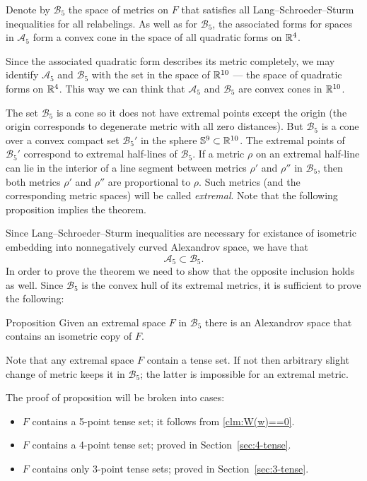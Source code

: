 \documentclass{article}
\begin{document}
Denote by $\mathcal{B}_5$ the space of metrics on $F$ that satisfies all Lang--Schroeder--Sturm inequalities for all relabelings.
As well as for $\mathcal{B}_5$, the associated forms for spaces in $\mathcal{A}_5$ form a convex cone in the space of all quadratic forms on $\mathbb{R}^4$.

Since the associated quadratic form describes its metric completely, we may identify $\mathcal{A}_5$ and $\mathcal{B}_5$ with the set in the space of $\mathbb{R}^{10}$ --- the space of quadratic forms on $\mathbb{R}^4$.
This way we can think that $\mathcal{A}_5$ and $\mathcal{B}_5$ are convex cones in $\mathbb{R}^{10}$.

The set $\mathcal{B}_5$ is a cone so it does not have extremal points except the origin (the origin corresponds to degenerate metric with all zero distances).
But $\mathcal{B}_5$ is a cone over a convex compact set $\mathcal{B}_5'$ in the sphere $\mathbb{S}^9\subset \mathbb{R}^{10}$.
The extremal points of $\mathcal{B}_5'$ correspond to extremal half-lines of $\mathcal{B}_5$.
If a metric $\rho$ on an extremal half-line can lie in the interior of a line segment between metrics $\rho'$ and $\rho''$ in $\mathcal{B}_5$, then both metrics $\rho'$ and $\rho''$ are proportional to $\rho$.
Such metrics (and the corresponding metric spaces) will be called \emph{extremal}.
Note that the following proposition implies the theorem.

Since Lang--Schroeder--Sturm inequalities are necessary for existance of isometric embedding into nonnegatively curved Alexandrov space,
we have that 
\[\mathcal{A}_5\subset\mathcal{B}_5.\]
In order to prove the theorem we need to show that the opposite inclusion holds as well.
Since $\mathcal{B}_5$ is the convex hull of its extremal metrics, it is sufficient to prove the following:

\begin{thm}{Proposition}\label{prop:main}
Given an extremal space $F$ in $\mathcal{B}_5$ there is an Alexandrov space that contains an isometric copy of $F$.
\end{thm}

Note that any extremal space  $F$ contain a tense set.
If not then arbitrary slight change of metric keeps it in $\mathcal{B}_5$;
the latter is impossible for an extremal metric.

The proof of proposition will be broken into cases:
\begin{itemize}
\item $F$ contains a 5-point  tense set; it follows from \ref{clm:W(w)==0}.
\item $F$ contains a 4-point  tense set; proved in Section~\ref{sec:4-tense}.
\item $F$ contains only 3-point  tense sets; proved in Section~\ref{sec:3-tense}.
\end{itemize}
\end{document}
